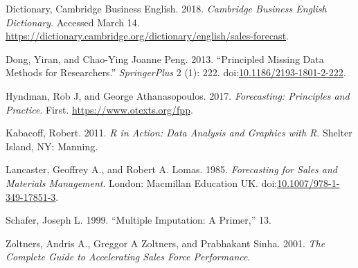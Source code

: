 \documentclass[11pt,]{article}
\begin{document}
\hypertarget{ref-cambridge_business_english_dictionary_cambridge_nodate}{}
Dictionary, Cambridge Business English. 2018. \emph{Cambridge Business
English Dictionary}. Accessed March 14.
\url{https://dictionary.cambridge.org/dictionary/english/sales-forecast}.

\hypertarget{ref-dong_principled_2013}{}
Dong, Yiran, and Chao-Ying Joanne Peng. 2013. ``Principled Missing Data
Methods for Researchers.'' \emph{SpringerPlus} 2 (1): 222.
doi:\href{https://doi.org/10.1186/2193-1801-2-222}{10.1186/2193-1801-2-222}.

\hypertarget{ref-hyndman_forecasting:_2017}{}
Hyndman, Rob J, and George Athana­sopou­los. 2017. \emph{Forecasting:
Principles and Practice}. First. \url{https://www.otexts.org/fpp}.

\hypertarget{ref-kabacoff_r_2011}{}
Kabacoff, Robert. 2011. \emph{R in Action: Data Analysis and Graphics
with R}. Shelter Island, NY: Manning.

\hypertarget{ref-lancaster_forecasting_1985}{}
Lancaster, Geoffrey A., and Robert A. Lomas. 1985. \emph{Forecasting for
Sales and Materials Management}. London: Macmillan Education UK.
doi:\href{https://doi.org/10.1007/978-1-349-17851-3}{10.1007/978-1-349-17851-3}.

\hypertarget{ref-schafer_multiple_1999}{}
Schafer, Joseph L. 1999. ``Multiple Imputation: A Primer,'' 13.

\hypertarget{ref-zoltners_complete_2001}{}
Zoltners, Andris A., Greggor A Zoltners, and Prabhakant Sinha. 2001.
\emph{The Complete Guide to Accelerating Sales Force Performance}.
\end{document}
